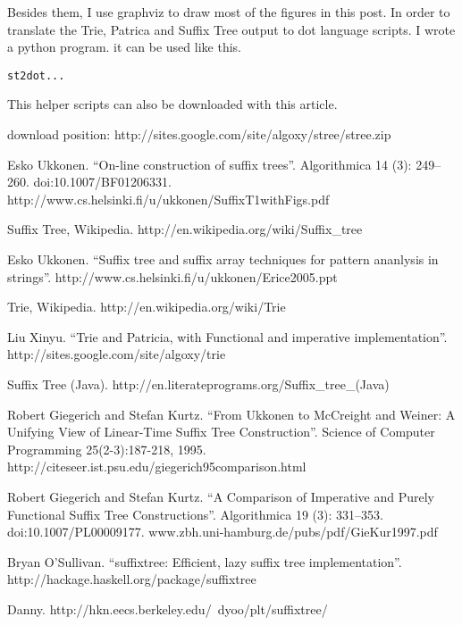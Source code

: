 \documentclass{article}
\begin{document}
Besides them, I use graphviz to draw most of the figures in this post. In order to
translate the Trie, Patrica and Suffix Tree output to dot language scripts. I wrote a python program.
it can be used like this.

\begin{verbatim}
st2dot...
\end{verbatim}

This helper scripts can also be downloaded with this article.

download position: http://sites.google.com/site/algoxy/stree/stree.zip

\begin{thebibliography}{99}

Esko Ukkonen. ``On-line construction of suffix trees''. Algorithmica 14 (3): 249--260. doi:10.1007/BF01206331. http://www.cs.helsinki.fi/u/ukkonen/SuffixT1withFigs.pdf

Suffix Tree, Wikipedia. http://en.wikipedia.org/wiki/Suffix\_tree

Esko Ukkonen. ``Suffix tree and suffix array techniques for pattern ananlysis in strings''. http://www.cs.helsinki.fi/u/ukkonen/Erice2005.ppt

Trie, Wikipedia. http://en.wikipedia.org/wiki/Trie

Liu Xinyu. ``Trie and Patricia, with Functional and imperative implementation''. http://sites.google.com/site/algoxy/trie

Suffix Tree (Java). http://en.literateprograms.org/Suffix\_tree\_(Java)

Robert Giegerich and Stefan Kurtz. ``From Ukkonen to McCreight and Weiner: A Unifying View of Linear-Time Suffix Tree Construction''. Science of Computer Programming 25(2-3):187-218, 1995. http://citeseer.ist.psu.edu/giegerich95comparison.html

Robert Giegerich and Stefan Kurtz. ``A Comparison of Imperative and Purely Functional Suffix Tree Constructions''. Algorithmica 19 (3): 331--353. doi:10.1007/PL00009177. www.zbh.uni-hamburg.de/pubs/pdf/GieKur1997.pdf

Bryan O'Sullivan. ``suffixtree: Efficient, lazy suffix tree implementation''. http://hackage.haskell.org/package/suffixtree

Danny. http://hkn.eecs.berkeley.edu/~dyoo/plt/suffixtree/


\end{thebibliography}
\end{document}
